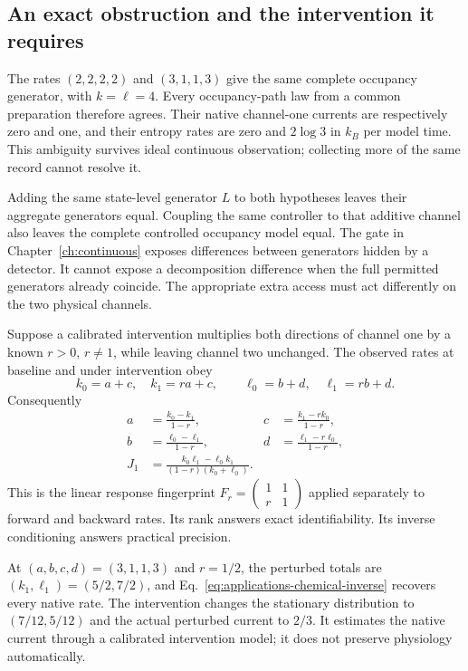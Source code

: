 \subsection{An exact obstruction and the intervention it requires}

The rates $(2,2,2,2)$ and $(3,1,1,3)$ give the same complete occupancy
generator, with $k=\ell=4$. Every occupancy-path law from a common preparation
therefore agrees. Their native channel-one currents are respectively zero
and one, and their entropy rates are zero and $2\log3$ in $k_B$ per model
time. This ambiguity survives ideal continuous observation; collecting more
of the same record cannot resolve it.

Adding the same state-level generator $L$ to both hypotheses leaves their
aggregate generators equal. Coupling the same controller to that additive
channel also leaves the complete controlled occupancy model equal. The gate
in Chapter~\ref{ch:continuous} exposes differences between generators hidden
by a detector. It cannot expose a decomposition difference when the full
permitted generators already coincide. The appropriate extra access must
act differently on the two physical channels.

Suppose a calibrated intervention multiplies both directions of channel one
by a known $r>0$, $r\ne1$, while leaving channel two unchanged. The observed
rates at baseline and under intervention obey
\begin{equation}
 k_0=a+c,\quad k_1=ra+c,\qquad
 \ell_0=b+d,\quad \ell_1=rb+d.
\end{equation}
Consequently
\begin{align}
 a&=\frac{k_0-k_1}{1-r},&c&=\frac{k_1-rk_0}{1-r},\nonumber\\
 b&=\frac{\ell_0-\ell_1}{1-r},&d&=\frac{\ell_1-r\ell_0}{1-r},
 \label{eq:applications-chemical-inverse}\\
 J_1&=\frac{k_0\ell_1-\ell_0k_1}{(1-r)(k_0+\ell_0)}.
 \label{eq:applications-chemical-current}
\end{align}
This is the linear response fingerprint
$F_r=\left(\begin{smallmatrix}1&1\\r&1\end{smallmatrix}\right)$ applied
separately to forward and backward rates. Its rank answers exact
identifiability. Its inverse conditioning answers practical precision.

At $(a,b,c,d)=(3,1,1,3)$ and $r=1/2$, the perturbed totals are
$(k_1,\ell_1)=(5/2,7/2)$, and Eq.~\eqref{eq:applications-chemical-inverse}
recovers every native rate. The intervention changes the stationary
distribution to $(7/12,5/12)$ and the actual perturbed current to $2/3$.
It estimates the native current through a calibrated intervention model;
it does not preserve physiology automatically.

